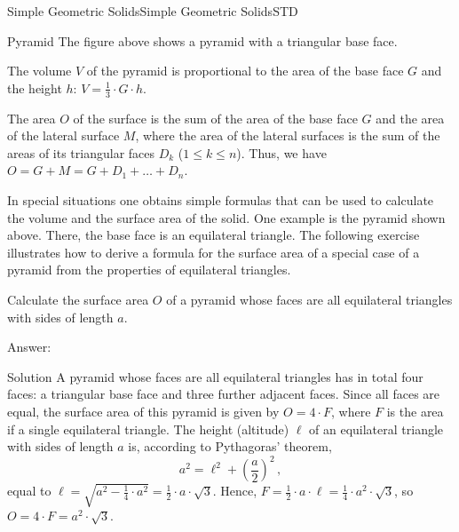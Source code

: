 \begin{MXContent}{Simple Geometric Solids}{Simple Geometric Solids}{STD}
\begin{MXInfo}{Pyramid}
The figure above shows a pyramid with a triangular base face.

The volume $V$ of the pyramid is proportional to the area of the base face 
$G$ and the height $h$: $V = \frac{1}{3} \cdot G \cdot h$.

The area $O$ of the surface is the sum of the area of the base face $G$ and 
the area of the lateral surface $M$, where the area of the lateral surfaces 
is the sum of the areas of its triangular faces $D_k$ ($1 \leq k \leq n$).
Thus, we have $O = G + M = G + D_1 + \ldots + D_n$.
\end{MXInfo}

In special situations one obtains simple formulas that can be used to 
calculate the volume and the surface area of the solid. One example is 
the pyramid shown above. There, the base face is an equilateral triangle. 
The following exercise illustrates how to derive a formula for the 
surface area of a special case of a pyramid from the properties of 
equilateral triangles.  

\begin{MExercise}
Calculate the surface area $O$ of a pyramid whose faces are all equilateral 
triangles with sides of length $a$.

Answer: 
{}

\begin{MHint}{Solution}
A pyramid whose faces are all equilateral triangles has in total four faces: 
a triangular base face and three further adjacent faces. Since all faces are equal,
the surface area of this pyramid is given by $O = 4 \cdot F$, where $F$ is the 
area if a single equilateral triangle. The height (altitude) $\ell$ of an equilateral
triangle with sides of length $a$ is, according to Pythagoras' theorem,
\[
a^2 = \ell^2 + \left(\frac{a}{2}\right)^2 \, , %
\]
equal to
$\ell = \sqrt{a^2 - \frac{1}{4} \cdot a^2} %
 = \frac{1}{2} \cdot a \cdot \sqrt{3}$.
Hence,
$F = \frac{1}{2} \cdot a \cdot \ell = \frac{1}{4} \cdot a^2 \cdot \sqrt{3}$, 
so
$O = 4 \cdot F = a^2 \cdot \sqrt{3}$.%
\end{MHint}
\end{MExercise}


\end{MXContent}
